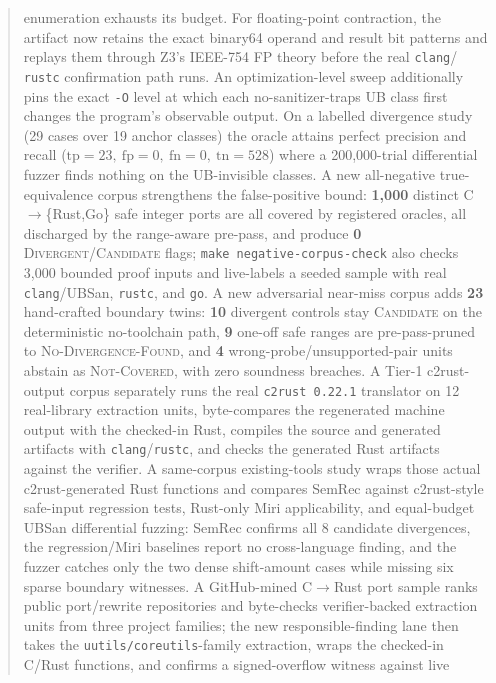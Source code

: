 \documentclass[10pt,a4paper]{article}
\begin{document}
\begin{abstract}
enumeration exhausts its budget. For floating-point contraction,
the artifact now retains the exact binary64 operand and result bit patterns and
replays them through Z3's IEEE-754 FP theory before the real \texttt{clang}/
\texttt{rustc} confirmation path runs. An optimization-level sweep
additionally pins the exact
\texttt{-O} level at which each no-sanitizer-traps UB class first changes the
program's observable output. On a labelled divergence study (29 cases over 19
anchor classes) the oracle attains perfect precision and recall ($\mathrm{tp}=23,\
\mathrm{fp}=0,\ \mathrm{fn}=0,\
\mathrm{tn}=528$) where a 200{,}000-trial differential fuzzer finds nothing on
the UB-invisible classes. A new all-negative true-equivalence corpus strengthens
the false-positive bound: \textbf{1{,}000} distinct C$\to$\{Rust,Go\} safe
integer ports are all covered by registered oracles, all discharged by the
range-aware pre-pass, and produce \textbf{0} \textsc{Divergent}/\textsc{Candidate}
flags; \texttt{make negative-corpus-check} also checks 3{,}000 bounded proof
inputs and live-labels a seeded sample with real \texttt{clang}/UBSan,
\texttt{rustc}, and \texttt{go}. A new adversarial near-miss corpus adds
\textbf{23} hand-crafted boundary twins: \textbf{10} divergent controls stay
\textsc{Candidate} on the deterministic no-toolchain path, \textbf{9} one-off
safe ranges are pre-pass-pruned to \textsc{No-Divergence-Found}, and
\textbf{4} wrong-probe/unsupported-pair units abstain as \textsc{Not-Covered},
with zero soundness breaches. A Tier-1 c2rust-output corpus separately runs the real
\texttt{c2rust 0.22.1} translator on 12 real-library extraction units,
byte-compares the regenerated machine output with the checked-in Rust, compiles
the source and generated artifacts with \texttt{clang}/\texttt{rustc}, and checks
the generated Rust artifacts against the verifier.  A same-corpus existing-tools
study wraps those actual c2rust-generated Rust functions and compares SemRec
against c2rust-style safe-input regression tests, Rust-only Miri applicability,
and equal-budget UBSan differential fuzzing: SemRec confirms all 8 candidate
divergences, the regression/Miri baselines report no cross-language finding, and
the fuzzer catches only the two dense shift-amount cases while missing six sparse
boundary witnesses. A GitHub-mined C$\to$Rust port
sample ranks public port/rewrite repositories and byte-checks verifier-backed
extraction units from three project families; the new responsible-finding lane
then takes the \texttt{uutils/coreutils}-family extraction, wraps the checked-in
C/Rust functions, and confirms a signed-overflow witness against live

\end{abstract}
\end{document}
